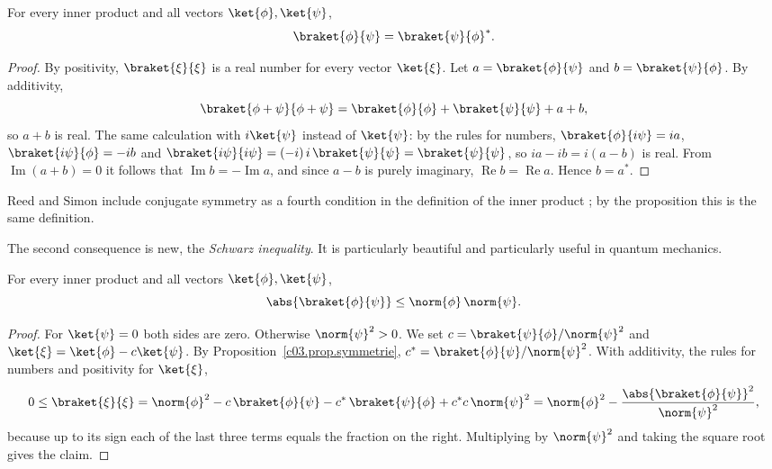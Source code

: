\begin{proposition}\label{c03.prop.symmetrie}
  For every inner product and all vectors $\ket{\phi}, \ket{\psi}$,
  \begin{equation}\label{c03.eq.symmetrie}
    \braket{\phi}{\psi} = \braket{\psi}{\phi}^* .
  \end{equation}
\end{proposition}
\begin{proof}
  By positivity, $\braket{\xi}{\xi}$ is a real number for every vector $\ket{\xi}$. Let
  $a = \braket{\phi}{\psi}$ and $b = \braket{\psi}{\phi}$. By additivity,
  \begin{equation}\label{c03.eq.symmetrie-beweis}
    \braket{\phi + \psi}{\phi + \psi} = \braket{\phi}{\phi} + \braket{\psi}{\psi} + a + b ,
  \end{equation}
  so $a + b$ is real. The same calculation with $i\ket{\psi}$ instead of $\ket{\psi}$: by the
  rules for numbers, $\braket{\phi}{i\psi} = i a$, $\braket{i\psi}{\phi} = -i b$ and
  $\braket{i\psi}{i\psi} = (-i)\, i\, \braket{\psi}{\psi} = \braket{\psi}{\psi}$, so
  $i a - i b = i (a - b)$ is real. From $\operatorname{Im}(a + b) = 0$ it follows that
  $\operatorname{Im} b = -\operatorname{Im} a$, and since $a - b$ is purely imaginary,
  $\operatorname{Re} b = \operatorname{Re} a$. Hence $b = a^*$.
\end{proof}

Reed and Simon include conjugate symmetry as a fourth condition in the definition of the inner
product ; by the proposition this is the same definition.

The second consequence is new, the \emph{Schwarz inequality}. It is particularly beautiful and
particularly useful in quantum mechanics.

\begin{proposition}\label{c03.prop.schwarz}
  For every inner product and all vectors $\ket{\phi}, \ket{\psi}$,
  \begin{equation}\label{c03.eq.schwarz}
    \abs{\braket{\phi}{\psi}} \leq \norm{\phi}\, \norm{\psi} .
  \end{equation}
\end{proposition}
\begin{proof}
  For $\ket{\psi} = 0$ both sides are zero. Otherwise $\norm{\psi}^2 > 0$. We set
  $c = \braket{\psi}{\phi} / \norm{\psi}^2$ and $\ket{\xi} = \ket{\phi} - c \ket{\psi}$. By
  Proposition~\ref{c03.prop.symmetrie}, $c^* = \braket{\phi}{\psi} / \norm{\psi}^2$. With
  additivity, the rules for numbers and positivity for $\ket{\xi}$,
  \begin{equation}\label{c03.eq.schwarz-beweis}
    0 \leq \braket{\xi}{\xi}
      = \norm{\phi}^2 - c\, \braket{\phi}{\psi} - c^*\, \braket{\psi}{\phi} + c^* c\, \norm{\psi}^2
      = \norm{\phi}^2 - \frac{\abs{\braket{\phi}{\psi}}^2}{\norm{\psi}^2} ,
  \end{equation}
  because up to its sign each of the last three terms equals the fraction on the right.
  Multiplying by $\norm{\psi}^2$ and taking the square root gives the claim.
\end{proof}

